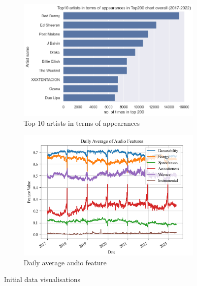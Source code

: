 \documentclass{article}
\begin{document}
\begin{figure}[h]
    \centering
    \begin{subfigure}[b]{0.49\textwidth}
        \centering
        \includegraphics[width=\textwidth]{Figures/top10artist.png}
        \caption{Top 10 artists in terms of appearances}
        \label{fig:Top10artiststop}
    \end{subfigure}
    \hfill
    \begin{subfigure}[b]{0.49\textwidth}
        \centering
        \includegraphics[width=\textwidth]{Mean}
        \caption{Daily average audio feature}
        \label{fig:Mean}
    \end{subfigure}
    \caption{Initial data visualisations}
    \label{fig:data_exploration}
\end{figure}

\end{document}
